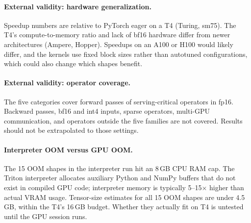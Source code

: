 \documentclass[11pt]{article}
\begin{document}
\paragraph{External validity: hardware generalization.}
Speedup numbers are relative to PyTorch eager on a T4 (Turing, sm75). The T4's compute-to-memory
ratio and lack of bf16 hardware differ from newer architectures (Ampere, Hopper). Speedups on an
A100 or H100 would likely differ, and the kernels use fixed block sizes rather than autotuned
configurations, which could also change which shapes benefit.

\paragraph{External validity: operator coverage.}
The five categories cover forward passes of serving-critical operators in fp16. Backward passes,
bf16 and int4 inputs, sparse operators, multi-GPU communication, and operators outside the five
families are not covered. Results should not be extrapolated to those settings.

\paragraph{Interpreter OOM versus GPU OOM.}
The 15 OOM shapes in the interpreter run hit an 8\,GB CPU RAM cap. The Triton interpreter
allocates auxiliary Python and NumPy buffers that do not exist in compiled GPU code; interpreter
memory is typically 5--15$\times$ higher than actual VRAM usage. Tensor-size estimates for all 15
OOM shapes are under 4.5\,GB, within the T4's 16\,GB budget. Whether they actually fit on T4 is
untested until the GPU session runs.

\end{document}
